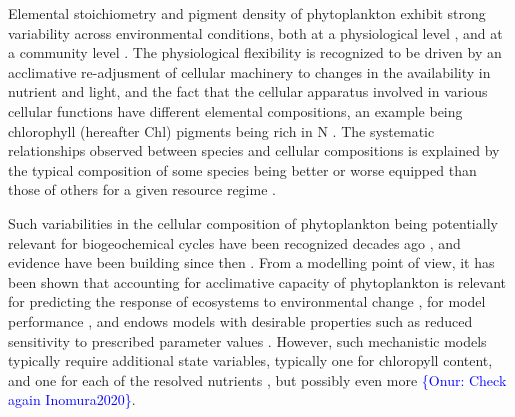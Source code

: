 \documentclass[gmd, manuscript]{copernicus}
\newcommand{\onur}[1]{\textcolor{blue}{\{Onur: #1\}}}
\begin{document}
Elemental stoichiometry and pigment density of phytoplankton exhibit strong variability across environmental conditions, both at a physiological level \citep[e.g.][]{Garcia2016}, and at a community level \citep[e.g.][]{MorenoMartiny2018}. The physiological flexibility is recognized to be driven by an acclimative re-adjusment of cellular machinery to changes in the availability in nutrient and light, and the fact that the cellular apparatus involved in various cellular functions have different elemental compositions, an example being chlorophyll (hereafter Chl) pigments being rich in N \citep{Geider2002}. The systematic relationships observed between species and cellular compositions is explained by the typical composition of some species being better or worse equipped than those of others for a given resource regime \citep{Arrigo2005,Burson2016}.

Such variabilities in the cellular composition of phytoplankton being potentially relevant for biogeochemical cycles have been recognized decades ago \citet{Redfield1934,Redfield1958}, and evidence have been building since then \citep{Lenton2007,Bonachela2016,Pahlow2020}. From a modelling point of view, it has been shown that accounting for acclimative capacity of phytoplankton is relevant for predicting the response of ecosystems to environmental change \citep{Kwiatkowski2018,Kerimoglu2018}, for model performance \citep{Ayata2013,Kerimoglu2017,Chen2018a}, and endows models with desirable properties such as reduced sensitivity to prescribed parameter values \citep{Anugerahanti2021}. However, such mechanistic models typically require additional state variables, typically one for chloropyll content, and one for each of the resolved nutrients \citep[e.g.][]{Geider1998,Flynn2003}, but possibly even more \citep{Bonachela2013,Wirtz2016,Inomura2020} \onur{Check again Inomura2020}. 
\end{document}
